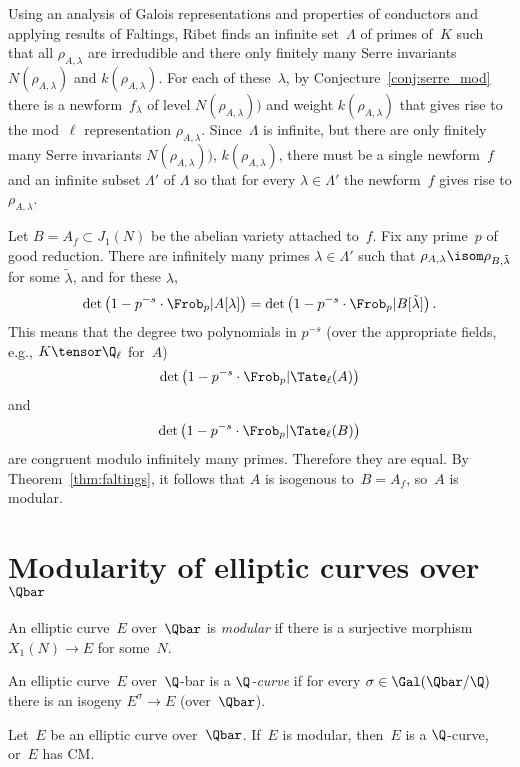 \documentclass{report}
\begin{document}
Using an analysis of Galois representations and properties of
conductors and applying results of Faltings, Ribet finds an infinite
set~$\Lambda$ of primes of~$K$ such that all $\rho_{A,\lambda}$ are
irredudible and there only finitely many Serre invariants
$N(\rho_{A,\lambda})$ and $k(\rho_{A,\lambda})$.  For each of
these~$\lambda$, by Conjecture~\ref{conj:serre_mod} there is a
newform~$f_{\lambda}$ of level $N(\rho_{A,\lambda}))$ and weight
$k(\rho_{A,\lambda})$ that gives rise to the mod~$\ell$ representation
$\rho_{A,\lambda}$.  Since~$\Lambda$ is infinite, but there are only
finitely many Serre invariants $N(\rho_{A,\lambda}))$,
$k(\rho_{A,\lambda})$, there must be a single newform~$f$ and an
infinite subset $\Lambda'$ of $\Lambda$ so that for every
$\lambda\in\Lambda'$ the newform~$f$ gives rise to $\rho_{A,\lambda}$.

Let $B=A_f\subset J_1(N)$ be the abelian variety attached to~$f$.
Fix any prime~$p$ of good reduction.
There are infinitely many primes $\lambda\in\Lambda'$ such
that $\rho_{A,\lambda}\isom \rho_{B,\tilde{\lambda}}$ for
some $\tilde{\lambda}$, and for these $\lambda$,
$$
  \det\left(1-p^{-s}\cdot \Frob_p|A[\lambda]\right)
   =
  \det\left(1-p^{-s}\cdot \Frob_p|B[\tilde{\lambda}]\right).
  $$
  This means that the degree two polynomials in $p^{-s}$ (over the
  appropriate fields, e.g., $K\tensor\Q_{\ell}$ for~$A$)
$$\det\left(1-p^{-s}\cdot \Frob_p|\Tate_{\ell}(A)\right)$$
and
$$\det\left(1-p^{-s}\cdot \Frob_p|\Tate_{\ell}(B)\right)$$
are congruent modulo infinitely many primes.  Therefore
they are equal. By Theorem~\ref{thm:faltings}, it follows
that $A$ is isogenous to~$B=A_f$, so~$A$ is modular.


\section{Modularity of elliptic curves over $\Qbar$}
\begin{definition}
  An elliptic curve~$E$ over~$\Qbar$ is {\em modular} if there is a
  surjective morphism $X_1(N)\to{}E$ for some~$N$.
\end{definition}

\begin{definition}[$\Q$-curve]
  An elliptic curve~$E$ over~$\Q$-bar is a {\em $\Q$-curve} if for
  every $\sigma\in\Gal(\Qbar/\Q)$ there is an isogeny $E^\sigma \to E$
  (over~$\Qbar$).
\end{definition}

\begin{theorem}[Ribet]
  Let~$E$ be an elliptic curve over~$\Qbar$.  If~$E$ is modular,
  then~$E$ is a $\Q$-curve, or~$E$ has CM.
\end{theorem}
\end{document}
